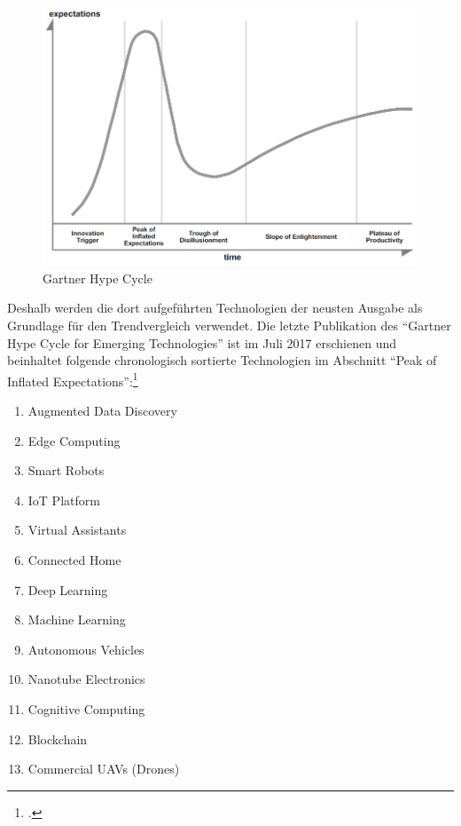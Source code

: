 \begin{figure}
	\centering
	\includegraphics[width=0.9\linewidth]{abbildungen/ghc}
	\caption{Gartner Hype Cycle}
	\label{fig:ghc}
\end{figure}

Deshalb werden die dort aufgeführten Technologien der neusten Ausgabe als Grundlage für den Trendvergleich verwendet. Die letzte Publikation des 
"`Gartner Hype Cycle for Emerging Technologies"' ist im Juli 2017 erschienen und beinhaltet folgende chronologisch sortierte Technologien im Abschnitt "`Peak of Inflated Expectations"':\footcite[Vgl.][S.34-55]{Walker2017}
\begin{enumerate}
	\label{emtech}
	\item Augmented Data Discovery
	\item Edge Computing
	\item Smart Robots
	\item IoT Platform
	\item Virtual Assistants
	\item Connected Home
	\item Deep Learning
	\item Machine Learning
	\item Autonomous Vehicles
	\item Nanotube Electronics
	\item Cognitive Computing
	\item Blockchain
	\item Commercial UAVs (Drones)
\end{enumerate}

